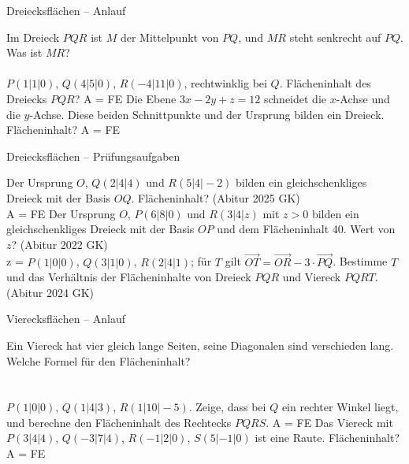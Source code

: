 \setcounter{aufgabe}{88}

\begin{aufgabe}{Dreiecksflächen – Anlauf}
\begin{teile}
\teil Im Dreieck $PQR$ ist $M$ der Mittelpunkt von $PQ$, und $MR$ steht senkrecht auf $PQ$. Was ist $MR$? \\  \\ 
\teil $P(1 | 1 | 0)$, $Q(4 | 5 | 0)$, $R(-4 | 11 | 0)$, rechtwinklig bei $Q$. Flächeninhalt des Dreiecks $PQR$? A = \leerfeld FE
\teil Die Ebene $3x - 2y + z = 12$ schneidet die $x$-Achse und die $y$-Achse. Diese beiden Schnittpunkte und der Ursprung bilden ein Dreieck. Flächeninhalt? A = \leerfeld FE
\end{teile}
\end{aufgabe}

\begin{aufgabe}{Dreiecksflächen – Prüfungsaufgaben}
\begin{teile}
\teil Der Ursprung $O$, $Q(2 | 4 | 4)$ und $R(5 | 4 | -2)$ bilden ein gleichschenkliges Dreieck mit der Basis $OQ$. Flächeninhalt? \hfill (Abitur 2025 GK) \\ A = \leerfeld FE
\teil Der Ursprung $O$, $P(6 | 8 | 0)$ und $R(3 | 4 | z)$ mit $z > 0$ bilden ein gleichschenkliges Dreieck mit der Basis $OP$ und dem Flächeninhalt 40. Wert von $z$? \hfill (Abitur 2022 GK) \\ z = \leerfeld
\teil $P(1 | 0 | 0)$, $Q(3 | 1 | 0)$, $R(2 | 4 | 1)$; für $T$ gilt $\overrightarrow{OT} = \overrightarrow{OR} - 3 \cdot \overrightarrow{PQ}$. Bestimme $T$ und das Verhältnis der Flächeninhalte von Dreieck $PQR$ und Viereck $PQRT$. \hfill (Abitur 2024 GK)
\end{teile}
\end{aufgabe}

\begin{aufgabe}{Vierecksflächen – Anlauf}
\begin{teile}
\teil Ein Viereck hat vier gleich lange Seiten, seine Diagonalen sind verschieden lang. Welche Formel für den Flächeninhalt? \\  \\  \\ 
\teil $P(1 | 0 | 0)$, $Q(1 | 4 | 3)$, $R(1 | 10 | -5)$. Zeige, dass bei $Q$ ein rechter Winkel liegt, und berechne den Flächeninhalt des Rechtecks $PQRS$. A = \leerfeld FE
\teil Das Viereck mit $P(3 | 4 | 4)$, $Q(-3 | 7 | 4)$, $R(-1 | 2 | 0)$, $S(5 | -1 | 0)$ ist eine Raute. Flächeninhalt? A = \leerfeld FE
\end{teile}
\end{aufgabe}

